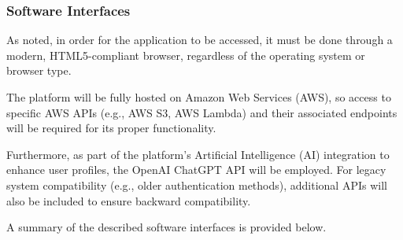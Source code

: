 

\subsubsection{Software Interfaces}

As noted, in order for the application to be accessed, it must be done through a modern, HTML5-compliant browser, regardless of the operating system or browser type. 

The platform will be fully hosted on Amazon Web Services (AWS), so access to specific AWS APIs (e.g., AWS S3, AWS Lambda) and their associated endpoints will be required for its proper functionality.

Furthermore, as part of the platform's Artificial Intelligence (AI) integration to enhance user profiles, the OpenAI ChatGPT API will be employed. 
For legacy system compatibility (e.g., older authentication methods), additional APIs will also be included to ensure backward compatibility.


A summary of the described software interfaces is provided below.

